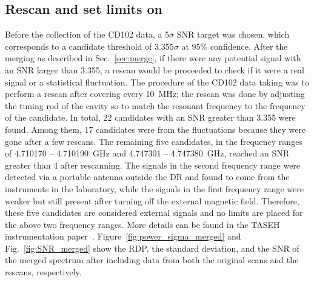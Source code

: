 



\subsection{Rescan and set limits on \gagg} 
Before the collection of the CD102 data, a 5$\sigma$ SNR target was chosen, 
which corresponds to a candidate threshold of 3.355$\sigma$ at 95\% confidence.
 After the merging as described in Sec.~\ref{sec:merge}, if there were 
any potential signal with an SNR larger than 
3.355, a rescan would be proceeded to check if it were a real signal 
or a statistical fluctuation. 
The procedure of the CD102 data taking was to perform a rescan after 
covering every 10~MHz; the rescan was done by adjusting the tuning rod of the 
cavity so to match the resonant frequency to the frequency of the candidate. 
In total, 22 candidates with an SNR greater than 3.355 were found. 
Among them, 17 candidates were from the fluctuations because they were gone 
after a few rescans. 
The remaining five candidates, in the frequency ranges of 
4.710170 -- 4.710190~GHz and 4.747301 -- 4.747380~GHz, reached an SNR greater than 
4 after rescanning. The signals in the second frequency 
range were detected via a portable antenna outside the DR and found 
to come from the instruments in the laboratory, while the signals 
in the first frequency range were weaker but still present after 
turning off the external magnetic field. 
Therefore, these five candidates are considered external signals and 
no limits are placed for the above two frequency ranges.  
More details can be found in the 
TASEH instrumentation paper~\cite{TASEHInstrumentation}. 
Figure~\ref{fig:power_sigma_merged} and Fig.~\ref{fig:SNR_merged} show the 
RDP, the standard deviation, and the SNR of the merged spectrum after 
including data from both the original scans and the rescans, respectively. 

